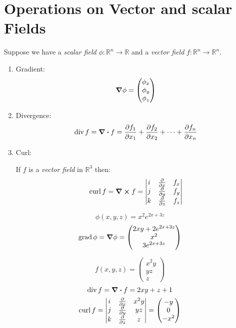 \documentclass[00_complete]{subfiles}
\begin{document}
\section{Operations on Vector and scalar Fields}
Suppose we have a \emph{scalar field} $\phi:\mathbb{R}^n \to \mathbb{R}$ and
a \emph{vector field} $f:\mathbb{R}^n\to \mathbb{R}^n$.
\begin{enumerate}
    \item Gradient:
        $$\grad \phi = \begin{pmatrix}
        \phi_x \\ \phi_y \\ \phi_z
    \end{pmatrix}$$
    \item Divergence:
        $$\operatorname{div} f = \div f= \pdv{f_1}{x_1}+\pdv{f_2}{x_2} + \dots + \pdv{f_n}{x_n}$$
    \item Curl:

        If $f$ is a \emph{vector field} in $\mathbb{R}^3$ then:
        $$\operatorname{curl} f = \curl f = \begin{vmatrix}
            i & \pdv{x} & f_x \\
            j & \pdv{y} & f_y \\
            k & \pdv{z} & f_z
        \end{vmatrix}$$
\end{enumerate}
\begin{example}
    $$\phi(x,y,z)=x^2e^{2x+3z}$$
    \begin{gather*}
        \operatorname{grad} \phi = \grad \phi = \begin{pmatrix}
        2xy + 2e^{2x+3z} \\
        x^2 \\
        3e^{2x+3z}
        \end{pmatrix}
    \end{gather*}
\end{example}
\begin{example}
    $$f(x,y,z)=\begin{pmatrix}
        x^2y \\ yz \\ z
    \end{pmatrix}$$
    \begin{gather*}
        \operatorname{div} f = \div f = 2xy + z + 1 \\
        \operatorname{curl} f = \begin{vmatrix}
            i & \pdv{x} & x^2y \\
            j & \pdv{y} & yz \\
            k & \pdv{z} & z
        \end{vmatrix} = \begin{pmatrix}
            -y \\ 0 \\ -x^2
        \end{pmatrix}
    \end{gather*}
\end{example}
\end{document}

